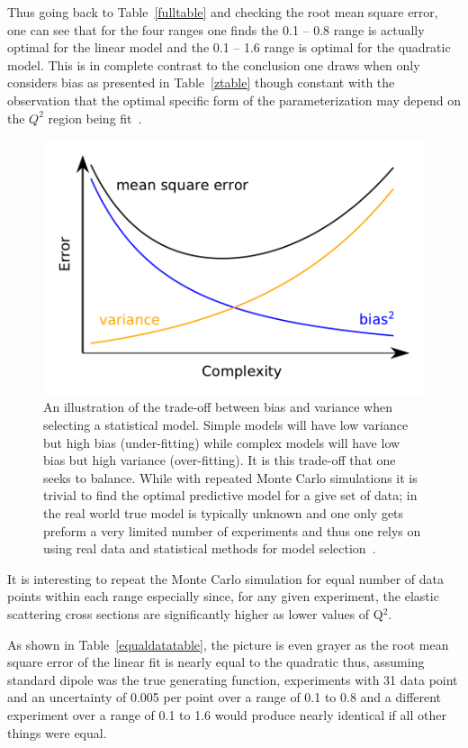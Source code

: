 \documentclass[10pt,aps,prc,twocolumn]{revtex4-1}
\begin{document}
Thus going back to Table~\ref{fulltable} and checking the root mean square error, one can see that for the four ranges
one finds the 0.1 -- 0.8 range is actually optimal for the linear model and the 0.1 -- 1.6 range is optimal for the quadratic model. 
This is in complete contrast to the conclusion one draws when only considers bias as presented in Table~\ref{ztable}
though constant with the observation that the optimal specific form of the parameterization may depend on the $Q^2$ region
being fit~\cite{Alberico:2008sz}.
\begin{figure}
\includegraphics[width=\columnwidth]{Figure/biasvariance-clean.pdf}
\caption{An illustration of the trade-off between bias and variance when selecting a statistical model.   Simple models
will have low variance but high bias (under-fitting) while complex models will have low bias but high variance (over-fitting).   
It is this trade-off that one seeks to balance.   While with repeated  Monte Carlo simulations it is trivial to find the optimal
predictive model for a give set of data; in the real world true model is typically unknown and one only gets preform a very limited number
of experiments and thus one relys on using real data and statistical methods for model selection~\cite{Hastie:2009}.
}
\end{figure}

It is interesting to repeat the Monte Carlo simulation for equal number of data points within each range
especially since, for any given experiment, the elastic scattering cross sections are significantly higher as lower values
of Q$^2$.

As shown in Table~\ref{equaldatatable}, the picture is even grayer as the root mean square error of the linear 
fit is nearly equal to the quadratic thus, assuming standard dipole was the true generating function,  experiments
with 31 data point and an uncertainty of 0.005 per point over a range of 0.1 to 0.8 and a different experiment
over a range of 0.1 to 1.6 would produce nearly identical if all other things were equal.
\end{document}
